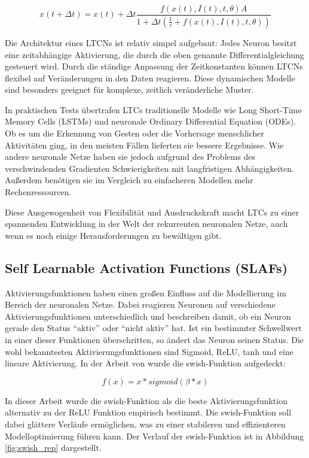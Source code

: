 \documentclass[11pt,ngerman,a4paper,]{article}
\begin{document}
\[
x(t + \Delta t) = x(t) + \Delta t \frac{f(x(t), I(t), t, \theta)A}{1 + \Delta t \left(\frac{1}{\tau} + f(x(t), I(t), t, \theta)\right)}
\]

Die Architektur eines LTCNs ist relativ simpel aufgebaut: Jedes Neuron besitzt eine zeitabhängige Aktivierung, die durch die oben genannte Differentialgleichung gesteuert wird. Durch die ständige Anpassung der Zeitkonstanten können LTCNs flexibel auf Veränderungen in den Daten reagieren. Diese dynamischen Modelle sind besonders geeignet für komplexe, zeitlich veränderliche Muster.

In praktischen Tests übertrafen LTCs traditionelle Modelle wie Long Short-Time Memory Cells (LSTMs) und neuronale Ordinary Differential Equation (ODEs). Ob es um die Erkennung von Gesten oder die Vorhersage menschlicher Aktivitäten ging, in den meisten Fällen lieferten sie bessere Ergebnisse. Wie andere neuronale Netze haben sie jedoch aufgrund des Problems des verschwindenden Gradienten Schwierigkeiten mit langfristigen Abhängigkeiten. Außerdem benötigen sie im Vergleich zu einfacheren Modellen mehr Rechenressourcen.

Diese Ausgewogenheit von Flexibilität und Ausdruckskraft macht LTCs zu einer spannenden Entwicklung in der Welt der rekurrenten neuronalen Netze, auch wenn es noch einige Herausforderungen zu bewältigen gibt.

\subsection{Self Learnable Activation Functions (SLAFs)}\label{self-learnable-activation-functions-slafs}

Aktivierungsfunktionen haben einen großen Einfluss auf die Modellierung im Bereich der neuronalen Netze. Dabei reagieren Neuronen auf verschiedene Aktivierungsfunktionen unterschiedlich und beschreiben damit, ob ein Neuron gerade den Status ``aktiv'' oder ``nicht aktiv'' hat. Ist ein bestimmter Schwellwert in einer dieser Funktionen überschritten, so ändert das Neuron seinen Status. Die wohl bekanntesten Aktivierungsfunktionen sind Sigmoid, ReLU, tanh und eine lineare Aktivierung. In der Arbeit von \cite{Ramachandran2017} wurde die swish-Funktion aufgedeckt:

\[
f(x) = x * sigmoid(\beta * x)
\]

In dieser Arbeit wurde die swish-Funktion als die beste Aktivierungsfunktion alternativ zu der ReLU Funktion empirisch bestimmt. Die swish-Funktion soll dabei glättere Verläufe ermöglichen, was zu einer stabileren und effizienteren Modelloptimierung führen kann. Der Verlauf der swish-Funktion ist in Abbildung \ref{fig:swish_rep} dargestellt.
\end{document}
